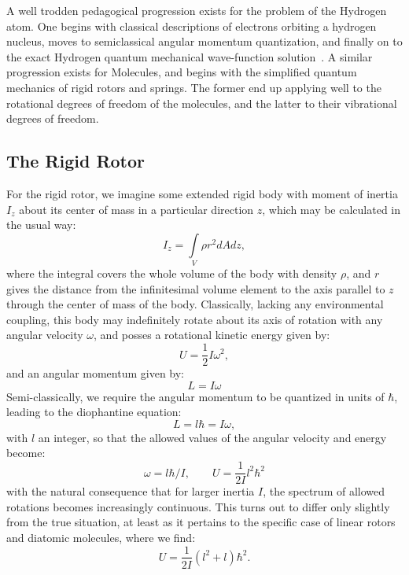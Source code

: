 A well trodden pedagogical progression exists for the problem of the Hydrogen atom. 
One begins with classical descriptions of electrons orbiting a hydrogen nucleus, moves to semiclassical angular momentum quantization, and finally on to the exact Hydrogen quantum mechanical wave-function solution~\citep[Sec.~4.2]{Griffiths2018}. 
A similar progression exists for Molecules, and begins with the simplified quantum mechanics of rigid rotors and springs.
The former end up applying well to the rotational degrees of freedom of the molecules, and the latter to their vibrational degrees of freedom.

\subsection{The Rigid Rotor}

For the rigid rotor, we imagine some extended rigid body with moment of inertia $I_z$ about its center of mass in a particular direction $z$, which may be calculated in the usual way:
\begin{equation}
I_z = \int\limits_V\rho r^2 dAdz,\label{izsimp}
\end{equation}
where the integral covers the whole volume of the body with density $\rho$, and $r$ gives the distance from the infinitesimal volume element to the axis parallel to $z$ through the center of mass of the body.
Classically, lacking any environmental coupling, this body may indefinitely rotate about its axis of rotation with any angular velocity $\omega$, and posses a rotational kinetic energy given by:
\begin{equation}
U=\frac{1}{2}I\omega^2,
\end{equation}
and an angular momentum given by:
\begin{equation}
L= I\omega
\end{equation}
Semi-classically, we require the angular momentum to be quantized in units of $\hbar$, leading to the diophantine equation:
\begin{equation}
L = l\hbar = I\omega,
\end{equation}
with $l$ an integer, so that the allowed values of the angular velocity and energy become:
\begin{equation}
\omega = l\hbar/I, \qquad U = \frac{1}{2I}l^2\hbar^2
\end{equation}
with the natural consequence that for larger inertia $I$, the spectrum of allowed rotations becomes increasingly continuous.
This turns out to differ only slightly from the true situation, at least as it pertains to the specific case of linear rotors and diatomic molecules, where we find:
\begin{equation}
U = \frac{1}{2I}(l^2 + l)\hbar^2.
\end{equation}


